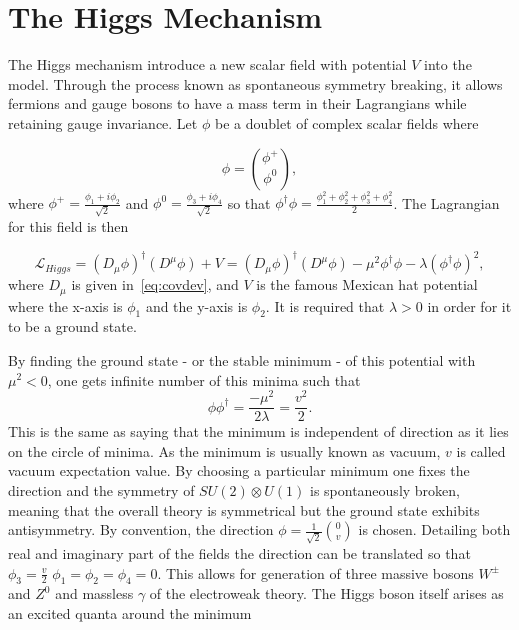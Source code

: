 \section{The Higgs Mechanism}
\label{higgs}
The Higgs mechanism introduce a new scalar field with potential $V$ into the model. Through the process known as spontaneous symmetry breaking, it allows fermions and gauge bosons to have a mass term in their Lagrangians while retaining gauge invariance. Let $\phi$ be a doublet of complex scalar fields where

\begin{equation}
\phi = \binom{\phi^{+}}{\phi^{0}},
\end{equation}
where $\phi^{+} = \frac{\phi_{1} + i{\phi_{2}}}{\sqrt{2}}$ and $\phi^{0} = \frac{\phi_{3} + i{\phi_{4}}}{\sqrt{2}}$ so that $\phi^{\dagger}\phi = \frac{\phi_{1}^{2} + \phi_{2}^{2} + \phi_{3}^{2} + \phi_{4}^{2}}{2}$.  The Lagrangian for this field is then

\begin{equation}
	\mathcal{L}_{Higgs} = (D_{\mu}\phi)^{\dagger}(D^{\mu}\phi) + V = (D_{\mu}\phi)^{\dagger}(D^{\mu}\phi) - \mu^{2}\phi^{\dagger}\phi - \lambda (\phi^{\dagger}\phi)^{2},
\end{equation}
where $D_{\mu}$ is given in~\autoref{eq:covdev}, and $V$ is the famous Mexican hat potential where the x-axis is $\phi_{1}$ and the y-axis is $\phi_{2}$. It is required that $\lambda>0$ in order for it to be a ground state.

By finding the ground state - or the stable minimum - of this potential with $\mu^{2}<0$, one gets infinite number of this minima such that
\begin{equation}
	\phi\phi^{\dagger}=\frac{-\mu^{2}}{2\lambda}=\frac{v^{2}}{2}.
\end{equation}
This is the same as saying that the minimum is independent of direction as it lies on the circle of minima. As the minimum is usually known as vacuum, $v$ is called vacuum expectation value. By choosing a particular minimum one fixes the direction and the symmetry of $SU(2)\otimes U(1)$ is spontaneously broken, meaning that the overall theory is symmetrical but the ground state exhibits antisymmetry. By convention, the direction $\phi=\frac{1}{\sqrt{2}}\binom{0}{v}$ is chosen. Detailing both real and imaginary part of the fields the direction can be translated so that $\phi_{3}=\frac{v}{2}$ $\phi_{1}=\phi_{2}=\phi_{4}=0$. This allows for generation of three massive bosons $W^{\pm}$ and $Z^{0}$ and massless $\gamma$ of the electroweak theory. The Higgs boson itself arises as an excited quanta around the minimum 

